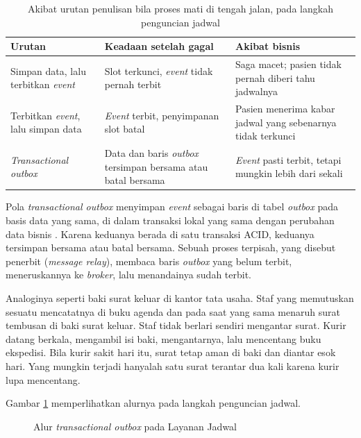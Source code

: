 \begin{table}[!htb]
  \centering
  \caption{Akibat urutan penulisan bila proses mati di tengah jalan, pada langkah penguncian jadwal}
  \label{tab:ch10-dual-write}
  \footnotesize
  \begin{tabularx}{\textwidth}{>{\raggedright\arraybackslash}p{2.8cm} >{\raggedright\arraybackslash}X >{\raggedright\arraybackslash}X}
    \hline
    \textbf{Urutan} & \textbf{Keadaan setelah gagal} & \textbf{Akibat bisnis} \\ \hline
    Simpan data, lalu terbitkan \textit{event} & Slot terkunci, \textit{event} tidak pernah terbit
      & Saga macet; pasien tidak pernah diberi tahu jadwalnya \\ \hline
    Terbitkan \textit{event}, lalu simpan data & \textit{Event} terbit, penyimpanan slot batal &
      Pasien menerima kabar jadwal yang sebenarnya tidak terkunci \\ \hline
    \textit{Transactional outbox} & Data dan baris \textit{outbox} tersimpan bersama atau batal
      bersama & \textit{Event} pasti terbit, tetapi mungkin lebih dari sekali \\ \hline
  \end{tabularx}
\end{table}

Pola \textit{transactional outbox} menyimpan \textit{event} sebagai baris di tabel
\textit{outbox} pada basis data yang sama, di dalam transaksi lokal yang sama dengan perubahan data
bisnis \cite{c10-richardson-outbox}. Karena keduanya berada di satu transaksi ACID, keduanya
tersimpan bersama atau batal bersama. Sebuah proses terpisah, yang disebut penerbit
(\textit{message relay}), membaca baris \textit{outbox} yang belum terbit, meneruskannya ke
\textit{broker}, lalu menandainya sudah terbit.

Analoginya seperti baki surat keluar di kantor tata usaha. Staf yang memutuskan sesuatu mencatatnya
di buku agenda dan pada saat yang sama menaruh surat tembusan di baki surat keluar. Staf tidak
berlari sendiri mengantar surat. Kurir datang berkala, mengambil isi baki, mengantarnya, lalu
mencentang buku ekspedisi. Bila kurir sakit hari itu, surat tetap aman di baki dan diantar esok
hari. Yang mungkin terjadi hanyalah satu surat terantar dua kali karena kurir lupa mencentang.

Gambar \ref{fig:ch10-outbox} memperlihatkan alurnya pada langkah penguncian jadwal.

\begin{figure}[!htb]
  \centering
  
  \caption{Alur \textit{transactional outbox} pada Layanan Jadwal}
  \label{fig:ch10-outbox}
\end{figure}

